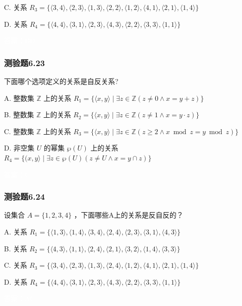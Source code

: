 \documentclass[UTF8, heading=true]{ctexart}
\begin{document}
C. 关系 $R_3=\{\langle 3,4\rangle,\langle 2,3\rangle,\langle 1,3\rangle,\langle 2,2\rangle,\langle 1,2\rangle,\langle 4,1\rangle,\langle 2,1\rangle,\langle 1,4\rangle\}$

D. 关系 $R_4=\{\langle 4,4\rangle,\langle 3,1\rangle,\langle 2,3\rangle,\langle 4,3\rangle,\langle 2,2\rangle,\langle 3,3\rangle,\langle 1,1\rangle\}$

\textcolor{white}{答案：BD}

\subsubsection{测验题6.23}
下面哪个选项定义的关系是自反关系?

A. 
整数集 $\mathbb{Z}$ 上的关系 $R_1=\{\langle x, y\rangle \mid \exists z \in \mathbb{Z}(z \neq 0 \wedge x=y+z)\}$

B. 
整数集 $\mathbb{Z}$ 上的关系 $R_2=\{\langle x, y\rangle \mid \exists z \in \mathbb{Z}(z \neq 1 \wedge x=y \cdot z)\}$

C. 
整数集 $\mathbb{Z}$ 上的关系 $R_3=\{\langle x, y\rangle \mid \exists z \in \mathbb{Z}(z \geq 2 \wedge x \bmod z=y \bmod z)\}$

D. 
非空集 $U$ 的幂集 $\wp(U)$ 上的关系 $R_4=\{(x, y\rangle \mid \exists z \in \wp(U)(z \neq U \wedge x=y \cap z)\}$

\textcolor{white}{答案：C}

\subsubsection{测验题6.24}

设集合 $A=\{1,2,3,4\}$ ，下面哪些A上的关系是反自反的？

A. 关系 $R_1=\{\langle 1,3\rangle,\langle 1,4\rangle,\langle 3,4\rangle,\langle 2,4\rangle,\langle 2,3\rangle,\langle 3,1\rangle,\langle 4,3\rangle\}$

B. 关系 $R_2=\{\langle 4,3\rangle,\langle 1,1\rangle,\langle 2,4\rangle,\langle 2,1\rangle,\langle 3,2\rangle,\langle 1,4\rangle,\langle 3,3\rangle\}$

C. 关系 $R_3=\{\langle 3,4\rangle,\langle 2,3\rangle,\langle 1,3\rangle,\langle 2,4\rangle,\langle 1,2\rangle,\langle 4,1\rangle,\langle 2,1\rangle,\langle 1,4\rangle\}$

D.  关系 $R_4=\{\langle 4,4\rangle,\langle 3,1\rangle,\langle 2,3\rangle,\langle 4,3\rangle,\langle 2,2\rangle,\langle 3,3\rangle,\langle 1,1\rangle\}$


\textcolor{white}{答案：AC}
\end{document}
